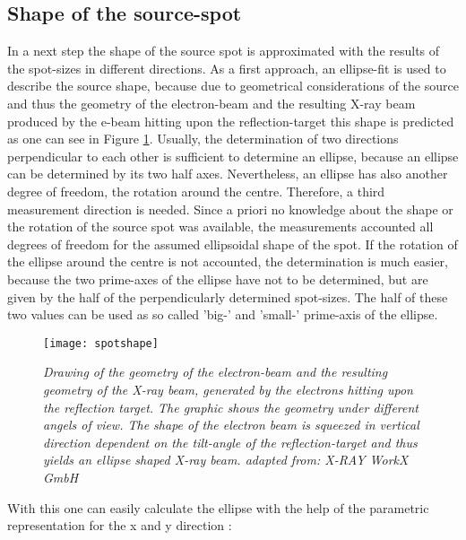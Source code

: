 \subsection{Shape of the source-spot}\label{subsec:spotshape}
In a next step the shape of the source spot is approximated with the results of the spot-sizes in different directions. As a first approach, an ellipse-fit is used to describe the source shape, because due to geometrical considerations of the source and thus the geometry of the electron-beam and the resulting X-ray beam produced by the e-beam hitting upon the reflection-target this shape is predicted as one can see in Figure \ref{sourceellipse}. Usually, the determination of two directions perpendicular to each other is sufficient to determine an ellipse, because an ellipse can be determined by its two half axes. Nevertheless, an ellipse has also another degree of freedom, the rotation around the centre. Therefore, a third measurement direction is needed. Since a priori no knowledge about the shape or the rotation of the source spot was available, the measurements accounted all degrees of freedom for the assumed ellipsoidal shape of the spot. If the rotation of the ellipse around the centre is not accounted, the determination is much easier, because the two prime-axes of the ellipse have not to be determined, but are given by the half of the perpendicularly determined spot-sizes. The half of these two values can be used as so called 'big-' and 'small-' prime-axis of the ellipse.
\begin{figure}[h]
	\begin{center}
		\texttt{[image: spotshape]}
	\end{center}
	\caption[Illustration of the geometry of the electron-beam and the resulting X-ray beam of the source]{\textit{Drawing of the geometry of the electron-beam and the resulting geometry of the X-ray beam, generated by the electrons hitting upon the reflection target. The graphic shows the geometry under different angels of view. The shape of the electron beam is squeezed in vertical direction dependent on the tilt-angle of the reflection-target and thus yields an ellipse shaped X-ray beam. adapted from: X-RAY WorkX GmbH}}
	\label{sourceellipse}
\end{figure} 
\clearpage
With this one can easily calculate the ellipse with the help of the parametric representation for the x and y direction \citep{Mathematik1997}: 
